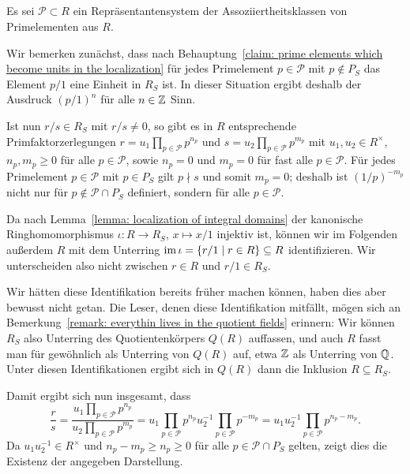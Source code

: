 \documentclass[a4paper,10pt,numbers=noenddot]{scrartcl}
\begin{document}
\subsection{}
Es sei $\mathcal{P} \subset R$ ein Repräsentantensystem der Assoziiertheitsklassen von Primelementen aus $R$.

Wir bemerken zunächst, dass nach Behauptung~\ref{claim: prime elements which become units in the localization} für jedes Primelement $p \in \mathcal{P}$ mit $p \notin P_S$ das Element $p/1$ eine Einheit in $R_S$ ist.
In dieser Situation ergibt deshalb der Ausdruck $(p/1)^n$ für alle $n \in \mathbb{Z}$ Sinn.

Ist nun $r/s \in R_S$ mit $r/s \neq 0$, so gibt es in $R$ entsprechende Primfaktorzerlegungen $r = u_1 \prod_{p \in \mathcal{P}} p^{n_p}$ und $s = u_2 \prod_{p \in \mathcal{P}} p^{m_p}$ mit $u_1, u_2 \in R^\times$, $n_p, m_p \geq 0$ für alle $p \in \mathcal{P}$, sowie $n_p = 0$ und $m_p = 0$ für fast alle $p \in \mathcal{P}$.
Für jedes Primelement $p \in \mathcal{P}$ mit $p \in P_S$ gilt $p \nmid s$ und somit $m_p = 0$;
deshalb ist $(1/p)^{-m_p}$ nicht nur für $p \notin \mathcal{P} \cap P_S$ definiert, sondern für alle $p \in \mathcal{P}$.

Da nach Lemma~\ref{lemma: localization of integral domains} der kanonische Ringhomomorphismus $\iota \colon R \to R_S$, $x \mapsto x/1$ injektiv ist, können wir im Folgenden außerdem $R$ mit dem Unterring $\operatorname{im} \iota = \{r/1 \mid r \in R\} \subseteq R$ identifizieren.
Wir unterscheiden also nicht zwischen $r \in R$ und $r/1 \in R_S$.

\begin{remark}
  Wir hätten diese Identifikation bereits früher machen können, haben dies aber bewusst nicht getan.
  Die Leser, denen diese Identifikation mitfällt, mögen sich an Bemerkung~\ref{remark: everythin lives in the quotient fields} erinnern:
  Wir können $R_S$ also Unterring des Quotientenkörpers $Q(R)$ auffassen, und auch $R$ fasst man für gewöhnlich als Unterring von $Q(R)$ auf, etwa $\mathbb{Z}$ als Unterring von $\mathbb{Q}$.
  Unter diesen Identifikationen ergibt sich in $Q(R)$ dann die Inklusion $R \subseteq R_S$.
\end{remark}

Damit ergibt sich nun insgesamt, dass
\[
    \frac{r}{s}
  = \frac{u_1 \prod_{p \in \mathcal{P}} p^{n_p}}{u_2 \prod_{p \in \mathcal{P}} p^{m_p}}
  = u_1 \prod_{p \in \mathcal{P}} p^{n_p} u_2^{-1} \prod_{p \in \mathcal{P}} p^{-m_p}
  = u_1 u_2^{-1} \prod_{p \in \mathcal{P}} p^{n_p - m_p}.
\]
Da $u_1 u_2^{-1} \in R^\times$ und $n_p - m_p \geq n_p \geq 0$ für alle $p \in \mathcal{P} \cap P_S$ gelten, zeigt dies die Existenz der angegeben Darstellung.
\end{document}
